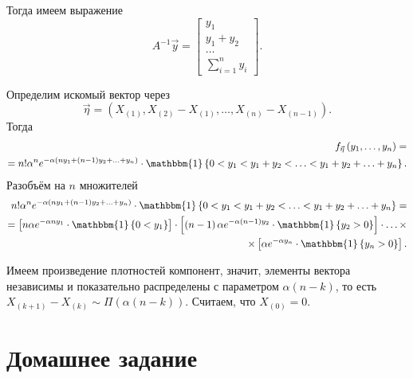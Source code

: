 Тогда имеем выражение
$$A^{-1} \vec{y} =
  \begin{bmatrix}
    y_1 \\
    y_1 + y_2 \\
    \dotsc \\
    \sum \limits_{i = 1}^n y_i
  \end{bmatrix}.$$

Определим искомый вектор через
$$ \vec{ \eta } =
  \left(
    X_{ \left( 1 \right) },
    X_{ \left( 2 \right) } - X_{ \left( 1 \right) },
    \dotsc,
    X_{ \left(n \right) } - X_{ \left( n - 1 \right) }
  \right).$$
Тогда
\begin{equation*}
  \begin{split}
    f_{ \vec{ \eta }} \left( y_1, \dotsc, y_n \right) = \\
    = n! \alpha^n e^{- \alpha \left( ny_1 + \left( n - 1 \right) y_2 + \dotsc + y_n \right) } \cdot
    \mathbbm{1} \left\{ 0 < y_1 < y_1 + y_2 < \dotsc < y_1 + y_2 + \dotsc + y_n \right\}.
  \end{split}
\end{equation*}
Разобъём на $n$ множителей
\begin{equation*}
  \begin{split}
    n! \alpha^n e^{- \alpha \left( ny_1 + \left( n - 1 \right) y_2 + \dotsc + y_n \right) } \cdot
    \mathbbm{1} \left\{ 0 < y_1 < y_1 + y_2 < \dotsc < y_1 + y_2 + \dotsc + y_n \right\} = \\
    = \left[ n \alpha e^{- \alpha ny_1} \cdot \mathbbm{1} \left\{ 0 < y_1 \right\} \right] \cdot
    \left[
      \left( n - 1 \right) \alpha e^{- \alpha \left( n - 1 \right) y_2} \cdot
      \mathbbm{1} \left\{ y_2 > 0 \right\}
    \right] \cdot \dotsc \times \\
    \times \left[ \alpha e^{- \alpha y_n} \cdot \mathbbm{1} \left\{ y_n > 0 \right\} \right].
  \end{split}
\end{equation*}

Имеем произведение плотностей компонент, значит,
элементы вектора независимы и показательно распределены с параметром
$ \alpha \left( n - k \right) $,
то есть
$X_{ \left( k + 1 \right) } - X_{ \left( k \right) } \sim
  \Pi \left( \alpha \left( n - k \right) \right) $.
Считаем, что $X_{ \left( 0 \right) } = 0$.

\section*{Домашнее задание}

